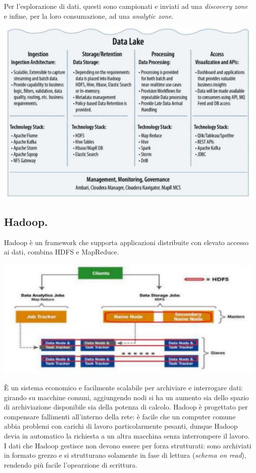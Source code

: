 \documentclass[a4page, 11pt]{article}
\begin{document}
Per l'esplorazione di dati, questi sono campionati e inviati ad una \textit{discovery zone} e infine, per la loro consumazione, ad una \textit{analytic zone}.
\begin{center}
  \includegraphics[scale=0.70]{IMAGE10.png}
\end{center}


\subsection{Hadoop.}
Hadoop è un framework che supporta applicazioni distribuite con elevato accesso ai dati, combina HDFS e MapReduce.
\begin{center}
  \includegraphics[scale=0.70]{IMAGE9.png}
\end{center}
È un sistema economico e facilmente scalabile per archiviare e interrogare dati: girando su macchine comuni, aggiungendo nodi si ha un aumento sia dello spazio di archiviazione disponibile sia della potenza di calcolo.
Hadoop è progettato per compensare fallimenti all'interno della rete: è facile che un computer comune abbia problemi con carichi di lavoro particolarmente pesanti, dunque Hadoop devia in automatico la richiesta a un altra macchina senza interrompere il lavoro.
I dati che Hadoop gestisce non devono essere per forza strutturati: sono archiviati in formato grezzo e si strutturano solamente in fase di lettura (\textit{schema on read}), rendendo più facile l'opearzione di scrittura.
\end{document}
